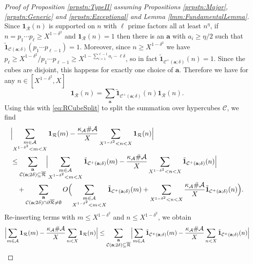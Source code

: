 \documentclass[10pt]{amsart}
\theoremstyle{plain}
\numberwithin{sblmm}{thrm}
\numberwithin{equation}{section}
\begin{document}
\begin{proof}[Proof of Proposition \ref{prpstn:TypeII} assuming Propositions \ref{prpstn:Major}, \ref{prpstn:Generic} and \ref{prpstn:Exceptional} and  Lemma \ref{lmm:FundamentalLemma}]
Since $\mathbf{1}_{\mathcal{R}}(n)$ is supported on $n$ with $\ell$ prime factors all at least $n^\eta$, if $n=p_1\cdots p_\ell\ge X^{1-\delta^2}$ and $\mathbf{1}_{\mathcal{R}}(n)=1$ then there is an $\mathbf{a}$ with $a_i\ge \eta/2$ such that $\tilde{\mathbf{1}}_{\mathcal{C}(\mathbf{a};\delta)}(p_1\cdots p_{\ell-1})=1$. Moreover, since $n\ge X^{1-\delta^2}$ we have $p_{\ell}\ge X^{1-\delta^2}/p_1\cdots p_{\ell-1}\ge X^{1-\sum_{i=1}^{\ell-1}a_i-\ell\delta}$, so in fact $\tilde{\mathbf{1}}_{\mathcal{C}^+(\mathbf{a};\delta)}(n)=1$. Since the cubes are disjoint, this happens for exactly one choice of $\mathbf{a}$. Therefore we have for any $n\in[X^{1- \delta^2},X]$
\[
\mathbf{1}_{\mathcal{R}}(n)=\sum_{\mathbf{a}}\tilde{\mathbf{1}}_{\mathcal{C}^+(\mathbf{a};\delta)}(n)\mathbf{1}_{\mathcal{R}}(n).
\]
Using this with \eqref{eq:RCubeSplit} to split the summation over hypercubes $\mathcal{C}$, we find
\begin{align*}
&\Bigl|\sum_{\substack{m\in\mathcal{A}\\ X^{1-\delta^2}<m<X}}\mathbf{1}_{\mathcal{R}}(m)-\frac{\kappa_\mathcal{A}\#\mathcal{A}}{X}\sum_{X^{1-\delta^2}<n< X}\mathbf{1}_{\mathcal{R}}(n)\Bigr|\\
%
&\le \sum_{\substack{\mathbf{a}\\ \mathcal{C}(\mathbf{a};2\delta)\subseteq\overline{\mathcal{R}}} }\Bigl|\sum_{\substack{m\in\mathcal{A}\\ X^{1-\delta^2}<m<X}}\tilde{\mathbf{1}}_{\mathcal{C}^+(\mathbf{a};\delta)}(m)-\frac{\kappa_\mathcal{A}\#\mathcal{A}}{X}\sum_{X^{1-\delta^2}<n< X}\tilde{\mathbf{1}}_{\mathcal{C}^+(\mathbf{a};\delta)}(n)\Bigr|\nonumber\\
&\quad+\sum_{\substack{\mathbf{a}\\ \mathcal{C}(\mathbf{a};2\delta)\cap\partial\overline{\mathcal{R}}\ne\emptyset} }O\Bigl(\sum_{\substack{m\in\mathcal{A}\\ X^{1-\delta^2}<m<X}}\tilde{\mathbf{1}}_{\mathcal{C}^+(\mathbf{a};\delta)}(m)+\sum_{X^{1-\delta^2}<n<X}\frac{\kappa_\mathcal{A}\#\mathcal{A}}{X}\tilde{\mathbf{1}}_{\mathcal{C}^+(\mathbf{a};\delta)}(n)\Bigr).
%
\end{align*}
Re-inserting terms with $m\le X^{1-\delta^2}$ and $n\le X^{1-\delta^2}$, we obtain
\begin{align}
\Bigl|\sum_{m\in\mathcal{A}}\mathbf{1}_{\mathcal{R}}(m)-\frac{\kappa_\mathcal{A}\#\mathcal{A}}{X}&\sum_{n< X}\mathbf{1}_{\mathcal{R}}(n)\Bigr|
%
\le \sum_{\substack{\mathbf{a}\\ \mathcal{C}(\mathbf{a};2\delta)\subseteq\overline{\mathcal{R}}} }\Bigl|\sum_{m\in\mathcal{A}}\tilde{\mathbf{1}}_{\mathcal{C}^+(\mathbf{a};\delta)}(m)-\frac{\kappa_\mathcal{A}\#\mathcal{A}}{X}\sum_{n< X}\tilde{\mathbf{1}}_{\mathcal{C}^+(\mathbf{a};\delta)}(n)\Bigr|\nonumber\\

\end{align}
\end{proof}
\end{document}
